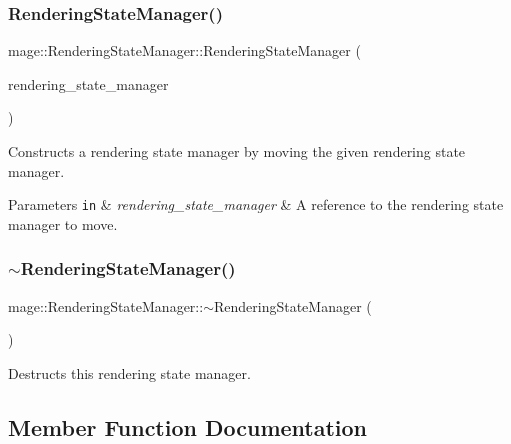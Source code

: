\subsubsection{\texorpdfstring{Rendering\+State\+Manager()}{RenderingStateManager()}\hspace{0.1cm}{\footnotesize\ttfamily [3/3]}}
{\footnotesize\ttfamily mage\+::\+Rendering\+State\+Manager\+::\+Rendering\+State\+Manager (\begin{DoxyParamCaption}\item[{\hyperlink{classmage_1_1_rendering_state_manager}{Rendering\+State\+Manager} \&\&}]{rendering\+\_\+state\+\_\+manager }\end{DoxyParamCaption})\hspace{0.3cm}{\ttfamily [default]}}

Constructs a rendering state manager by moving the given rendering state manager.


\begin{DoxyParams}[1]{Parameters}
\mbox{\tt in}  & {\em rendering\+\_\+state\+\_\+manager} & A reference to the rendering state manager to move. \\
\hline
\end{DoxyParams}
\hypertarget{classmage_1_1_rendering_state_manager_ad4865219aaaac55dd53c4ab51af8d63f}{}\label{classmage_1_1_rendering_state_manager_ad4865219aaaac55dd53c4ab51af8d63f} 
\subsubsection{\texorpdfstring{$\sim$\+Rendering\+State\+Manager()}{~RenderingStateManager()}}
{\footnotesize\ttfamily mage\+::\+Rendering\+State\+Manager\+::$\sim$\+Rendering\+State\+Manager (\begin{DoxyParamCaption}{ }\end{DoxyParamCaption})\hspace{0.3cm}{\ttfamily [default]}}

Destructs this rendering state manager. 

\subsection{Member Function Documentation}
\hypertarget{classmage_1_1_rendering_state_manager_a4a7efd0f64898b05ee8c8ffd86be2aef}{}\label{classmage_1_1_rendering_state_manager_a4a7efd0f64898b05ee8c8ffd86be2aef} 
